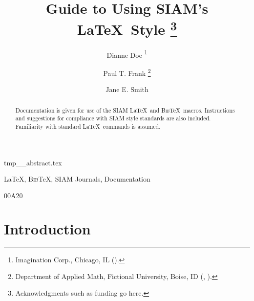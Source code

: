 \documentclass[]{siamart}
\title{Guide to Using SIAM's \LaTeX\ Style%
  \thanks{Acknowledgments such as funding go here.}}
\author{Dianne Doe%
  \thanks{Imagination Corp., Chicago, IL (\email{ddoe@imag.com}).}%
  \and
  Paul T. Frank%
  \thanks{Department of Applied Math, Fictional University, Boise, ID
    (\email{ptfrank@fictional.edu}, \email{jesmith@fictional.edu}).}
  \and
  Jane E. Smith%
  \footnotemark[3]
}
\newcommand{\BibTeX}{{\scshape Bib}\TeX\xspace}
\begin{document}
\maketitle

\begin{tcbverbatimwrite}{tmp_\jobname_abstract.tex}
\begin{abstract}
  Documentation is given for use of the SIAM \LaTeX\ and \BibTeX\
  macros.  Instructions and suggestions for compliance with SIAM style
  standards are also included. Familiarity with standard \LaTeX\
  commands is assumed.
\end{abstract}

\begin{keywords}
  \LaTeX, \BibTeX, SIAM Journals, Documentation 
\end{keywords}

\begin{AMS}
  00A20 
\end{AMS}
\end{tcbverbatimwrite}


\section{Introduction}
\label{sec:intro}
\end{document}
